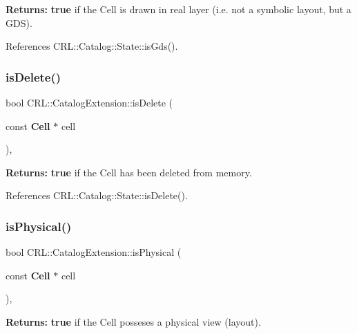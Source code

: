 {\bfseries Returns\+:} {\bfseries true} if the Cell is drawn in real layer (i.\+e. not a symbolic layout, but a G\+DS). 

References C\+R\+L\+::\+Catalog\+::\+State\+::is\+Gds().

\mbox{\label{classCRL_1_1CatalogExtension_a90e941d2349f5a0f4f7fefb41b434b0a}} 
\subsubsection{\texorpdfstring{is\+Delete()}{isDelete()}}
{\footnotesize\ttfamily bool C\+R\+L\+::\+Catalog\+Extension\+::is\+Delete (\begin{DoxyParamCaption}\item[{const \textbf{ Cell} $\ast$}]{cell }\end{DoxyParamCaption})\hspace{0.3cm}{\ttfamily [inline]}, {\ttfamily [static]}}

{\bfseries Returns\+:} {\bfseries true} if the Cell has been deleted from memory. 

References C\+R\+L\+::\+Catalog\+::\+State\+::is\+Delete().

\mbox{\label{classCRL_1_1CatalogExtension_a3af53ef4a7fa512a079adbcb68677e2f}} 
\subsubsection{\texorpdfstring{is\+Physical()}{isPhysical()}}
{\footnotesize\ttfamily bool C\+R\+L\+::\+Catalog\+Extension\+::is\+Physical (\begin{DoxyParamCaption}\item[{const \textbf{ Cell} $\ast$}]{cell }\end{DoxyParamCaption})\hspace{0.3cm}{\ttfamily [inline]}, {\ttfamily [static]}}

{\bfseries Returns\+:} {\bfseries true} if the Cell posseses a physical view (layout). 

